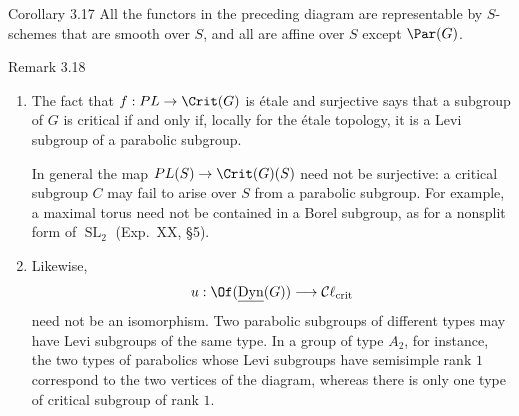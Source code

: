 \begin{sgastatement}{Corollary 3.17}
All the functors in the preceding diagram are representable by
\(S\)-schemes that are smooth over \(S\), and all are affine over \(S\)
except \(\Par(G)\).
\end{sgastatement}

\begin{sgastatement}{Remark 3.18}
\begin{enumerate}[label=\textup{(\roman*)}]
\item The fact that \(f:PL\to\Crit(G)\) is étale and surjective says that
a subgroup of \(G\) is critical if and only if, locally for the étale
topology, it is a Levi subgroup of a parabolic subgroup.

In general the map \(PL(S)\to\Crit(G)(S)\) need not be surjective: a
critical subgroup \(C\) may fail to arise over \(S\) from a parabolic
subgroup.  For example, a maximal torus need not be contained in a Borel
subgroup, as for a nonsplit form of \(\operatorname{SL}_2\)
\textup{(Exp.\ XX, §5)}.
\item Likewise,
\[
 u:\Of(\underline{\operatorname{Dyn}}(G))
 \longrightarrow\mathcal C\ell_{\mathrm{crit}}
\]
need not be an isomorphism.  Two parabolic subgroups of different types
may have Levi subgroups of the same type.  In a group of type \(A_2\),
for instance, the two types of parabolics whose Levi subgroups have
semisimple rank \(1\) correspond to the two vertices of the diagram,
whereas there is only one type of critical subgroup of rank \(1\).


\end{enumerate}
\end{sgastatement}
